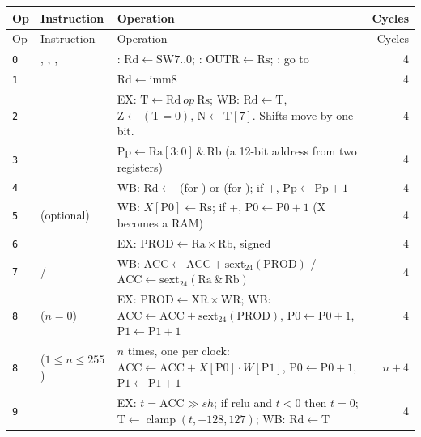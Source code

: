 {\small
\begin{xltabular}{\linewidth}{@{}l l L r@{}}
\toprule
Op & Instruction & Operation & Cycles \\
\midrule\endfirsthead
\toprule
Op & Instruction & Operation & Cycles \\
\midrule\endhead
\bottomrule\endlastfoot
\texttt{0} & , , ,  & : $\mathrm{Rd} \gets \mathrm{SW7..0}$; : $\mathrm{OUTR} \gets \mathrm{Rs}$; : go to  & 4 \\*
\texttt{1} &  & $\mathrm{Rd} \gets \mathrm{imm8}$ & 4 \\
\texttt{2} &  & EX: $\mathrm{T} \gets \mathrm{Rd}\ \mathit{op}\ \mathrm{Rs}$; WB: $\mathrm{Rd} \gets \mathrm{T}$, $\mathrm{Z} \gets (\mathrm{T}=0)$, $\mathrm{N} \gets \mathrm{T}[7]$. Shifts move  by one bit. & 4 \\
\texttt{3} &  & $\mathrm{Pp} \gets \mathrm{Ra}[3{:}0] \,\&\, \mathrm{Rb}$ (a 12-bit address from two registers) & 4 \\
\texttt{4} &  & WB: $\mathrm{Rd} \gets$  (for ) or  (for ); if +, $\mathrm{Pp} \gets \mathrm{Pp}+1$ & 4 \\
\texttt{5} &  (optional) & WB: $X[\mathrm{P0}] \gets \mathrm{Rs}$; if +, $\mathrm{P0} \gets \mathrm{P0}+1$ (X becomes a RAM) & 4 \\
\texttt{6} &  & EX: $\mathrm{PROD} \gets \mathrm{Ra} \times \mathrm{Rb}$, signed & 4 \\
\texttt{7} &  /  & WB: $\mathrm{ACC} \gets \mathrm{ACC} + \mathrm{sext}_{24}(\mathrm{PROD})$ / $\mathrm{ACC} \gets \mathrm{sext}_{24}(\mathrm{Ra}\,\&\,\mathrm{Rb})$ & 4 \\
\texttt{8} &  ($n = 0$) & EX: $\mathrm{PROD} \gets \mathrm{XR} \times \mathrm{WR}$; WB: $\mathrm{ACC} \gets \mathrm{ACC} + \mathrm{sext}_{24}(\mathrm{PROD})$, $\mathrm{P0} \gets \mathrm{P0}+1$, $\mathrm{P1} \gets \mathrm{P1}+1$ & 4 \\
\texttt{8} &  ($1 \le n \le 255$) & $n$ times, one per clock: $\mathrm{ACC} \gets \mathrm{ACC} + X[\mathrm{P0}] \cdot W[\mathrm{P1}]$, $\mathrm{P0} \gets \mathrm{P0}+1$, $\mathrm{P1} \gets \mathrm{P1}+1$ & $n+4$ \\
\texttt{9} &  & EX: $t = \mathrm{ACC} \gg sh$; if relu and $t<0$ then $t=0$; $\mathrm{T} \gets \operatorname{clamp}(t,-128,127)$; WB: $\mathrm{Rd} \gets \mathrm{T}$ & 4 \\

\end{xltabular}}
